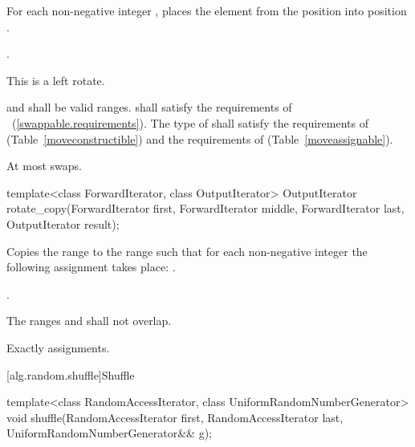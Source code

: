 \begin{itemdescr}
\pnum
\effects
For each non-negative integer
,
places the element from the position
into position
.

\pnum
\returns {}.

\pnum
\notes
This is a left rotate.

\pnum
\requires
{}
and
shall be valid ranges.
 shall satisfy the requirements of
~(\ref{swappable.requirements}). The type of  shall satisfy
the requirements of 
(Table~\ref{moveconstructible}) and the
requirements of
(Table~\ref{moveassignable}).


\pnum
\complexity
At most
swaps.
\end{itemdescr}

%
\begin{itemdecl}
template<class ForwardIterator, class OutputIterator>
  OutputIterator
    rotate_copy(ForwardIterator first, ForwardIterator middle,
                ForwardIterator last, OutputIterator result);
\end{itemdecl}

\begin{itemdescr}
\pnum
\effects
Copies the range
to the range
such that for each non-negative integer
the following assignment takes place:
.

\pnum
\returns
{}.

\pnum
\requires
The ranges
and
shall not overlap.

\pnum
\complexity
Exactly
assignments.
\end{itemdescr}

[alg.random.shuffle]{Shuffle}

%
\begin{itemdecl}
template<class RandomAccessIterator, class UniformRandomNumberGenerator>
  void shuffle(RandomAccessIterator first,
                      RandomAccessIterator last,
                      UniformRandomNumberGenerator&& g);
\end{itemdecl}

